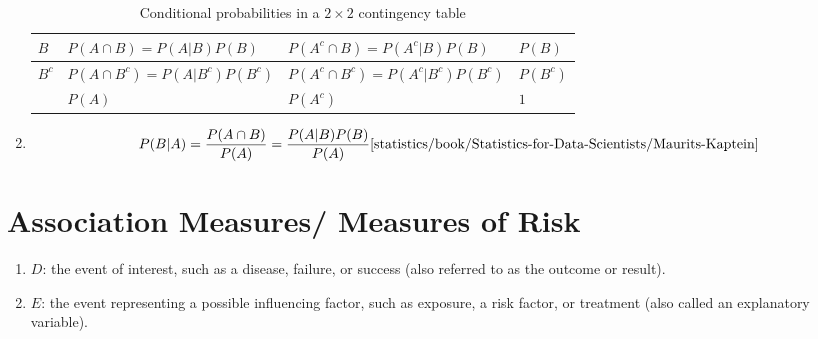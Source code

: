 \begin{enumerate}
\begin{customArrayStretch}{1.2}
\begin{table}[H]
\begin{tabular}{|l||l|l|l|}
                  $B$ & $P (A \cap B) = P (A|B) P (B)$ & $P (A^c \cap B) = P (A^c|B) P (B)$ & $P (B)$ \\
                  \hline
                  
                  $B^c$ & $P (A \cap B^c) = P (A|B^c) P (B^c)$ & $P (A^c \cap B^c) = P (A^c|B^c) P (B^c)$ & $P (B^c)$ \\
                  \hline
                  
                  & $P (A)$ & $P (A^c)$ & $1$ \\
                  \hline
            \end{tabular}
            \caption{Conditional probabilities in a $2 \times 2$ contingency table \cite{statistics/book/Statistics-for-Data-Scientists/Maurits-Kaptein}}
            \label{statistics/probability-theory/Conditional Probability/Conditional-probabilities-contingency-table}
        \end{table}
    \end{customArrayStretch}

    \item 
    \begin{theorem}
        \[
            P(B|A) 
            = \dfrac{P(A\cap B)}{P(A)} = \dfrac{P(A|B) P(B)}{P(A)}
            \text{\cite{statistics/book/Statistics-for-Data-Scientists/Maurits-Kaptein}}
        \]
    \end{theorem}
\end{enumerate}




\section{Association Measures/ Measures of Risk}

\begin{enumerate}
    \item $D$: the event of interest, such as a disease, failure, or success (also referred to as the outcome or result).
    \hfill \cite{statistics/book/Statistics-for-Data-Scientists/Maurits-Kaptein, common/online/chatgpt}

    \item $E$: the event representing a possible influencing factor, such as exposure, a risk factor, or treatment (also called an explanatory variable).
    \hfill \cite{statistics/book/Statistics-for-Data-Scientists/Maurits-Kaptein, common/online/chatgpt}
\end{enumerate}


